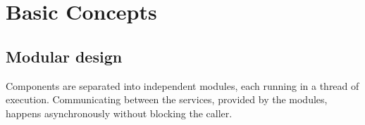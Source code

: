 \section{\color{fancy}Basic Concepts}


\subsection{Modular design}

Components are separated into independent modules, each running in a thread of execution.
Communicating between the services, provided by the modules, happens asynchronously without blocking the caller.
